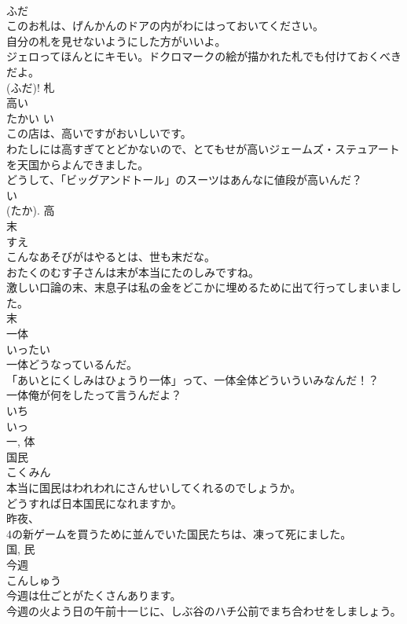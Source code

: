 \documentclass[8pt]{extreport}
\begin{document}
\begin{CJK}{UTF8}{min}
\\	ふだ	
\\	このお札は、げんかんのドアの内がわにはっておいてください。	
\\	自分の札を見せないようにした方がいいよ。	
\\	ジェロってほんとにキモい。ドクロマークの絵が描かれた札でも付けておくべきだよ。	
\\	(ふだ)!	札	
\\	高い	
\\	たかい	い 
\\	この店は、高いですがおいしいです。	
\\	わたしには高すぎてとどかないので、とてもせが高いジェームズ・ステュアートを天国からよんできました。	
\\	どうして、「ビッグアンドトール」のスーツはあんなに値段が高いんだ？	
\\	い 
\\	(たか).	高	
\\	末	
\\	すえ	
\\	こんなあそびがはやるとは、世も末だな。	
\\	おたくのむす子さんは末が本当にたのしみですね。	
\\	激しい口論の末、末息子は私の金をどこかに埋めるために出て行ってしまいました。	
\\	末	
\\	一体	
\\	いったい	
\\	一体どうなっているんだ。	
\\	「あいとにくしみはひょうり一体」って、一体全体どういういみなんだ！？	
\\	一体俺が何をしたって言うんだよ？	
\\	いち 
\\	いっ 
\\	一, 体	
\\	国民	
\\	こくみん	
\\	本当に国民はわれわれにさんせいしてくれるのでしょうか。	
\\	どうすれば日本国民になれますか。	
\\	昨夜、
\\	4の新ゲームを買うために並んでいた国民たちは、凍って死にました。	
\\	国, 民	
\\	今週	
\\	こんしゅう	
\\	今週は仕ごとがたくさんあります。	
\\	今週の火よう日の午前十一じに、しぶ谷のハチ公前でまち合わせをしましょう。	

\end{CJK}
\end{document}
